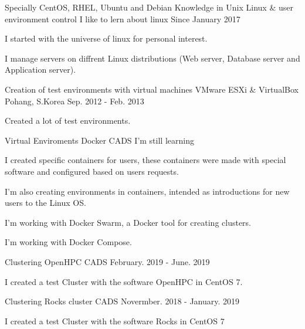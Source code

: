 \begin{cventries}
	\cventry
	{Specially CentOS, RHEL, Ubuntu and Debian}
	{Knowledge in Unix Linux \& user environment control}
	{I like to lern about linux }
	{Since January 2017 }
	{
	\begin{cvitems}
		\item {I started with the universe of linux for personal interest.
		\item I manage servers on diffrent Linux distributions (Web server, Database server and Application server). }
	\end{cvitems}
	}
  \cventry
    {Creation of test environments with virtual machines}
    {VMware ESXi \& VirtualBox}
    {Pohang, S.Korea}
    {Sep. 2012 - Feb. 2013}
    {
      \begin{cvitems}
        \item {Created a lot of test environments.}
      \end{cvitems} 
    }
  \cventry
    {Virtual Enviroments}
    {Docker}
    {CADS}
    {I'm still learning}
    {
      \begin{cvitems}
        \item {I created specific containers for users, these containers were made with special software and configured based on users requests.
        \item I'm also creating environments in containers, intended as introductions for new users to the Linux OS.
	    \item I'm working with Docker Swarm, a Docker tool for creating clusters.
    	    \item I'm working with Docker Compose.}
      \end{cvitems}
    }
  \cventry
    {Clustering}
    {OpenHPC}
    {CADS }
    {February. 2019 - June. 2019}
    {
      \begin{cvitems}
        \item {I created a test Cluster with the software OpenHPC in CentOS 7.}
      \end{cvitems}
    }
  \cventry
	{Clustering}
	{Rocks cluster}
	{CADS }
	{Novermber. 2018 - January. 2019}
	{
	\begin{cvitems}
		\item {I created a test Cluster with the software Rocks in CentOS 7}
	\end{cvitems}
	}

    
\end{cventries}
